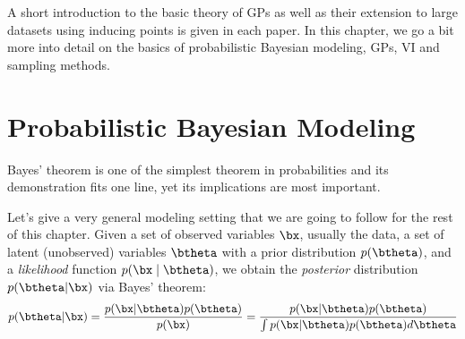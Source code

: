 


\graphicspath{{2/figures/}}

A short introduction to the basic theory of \acl{GPs} as well as their extension to large datasets using inducing points \cite{Titsias2009} is given in each paper.
In this chapter, we go a bit more into detail on the basics of probabilistic Bayesian modeling, \acl{GPs}, \acl{VI} and sampling methods.


\section{Probabilistic Bayesian Modeling}

\label{sec:prob_bayes}

Bayes' theorem is one of the simplest theorem in probabilities and its demonstration fits one line, yet its implications are most important.

Let's give a very general modeling setting that we are going to follow for the rest of this chapter.
Given a set of observed variables $\bx$, usually the data, a set of latent (unobserved) variables $\btheta$ with a prior distribution $p(\btheta)$, and a \textit{likelihood} function $p(\bx\mid\btheta)$, we obtain the \textit{posterior} distribution $p(\btheta|\bx)$ via Bayes' theorem:
\begin{align}
p(\btheta|\bx) = \frac{p(\bx|\btheta)p(\btheta)}{p(\bx)} = \frac{p(\bx|\btheta)p(\btheta)}{\int p(\bx|\btheta)p(\btheta)d\btheta}
\label{eq:bayes}
\end{align}

